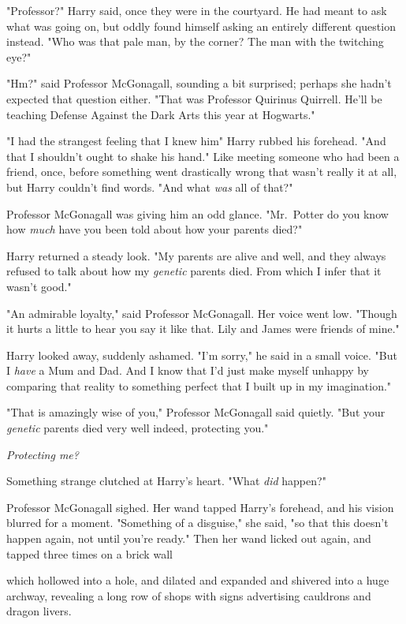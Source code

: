 "Professor?" Harry said, once they were in the courtyard. He had meant to ask
what was going on, but oddly found himself asking an entirely different
question instead. "Who was that pale man, by the corner? The man with the
twitching eye?"

"Hm?" said Professor McGonagall, sounding a bit surprised; perhaps she hadn't
expected that question either. "That was Professor Quirinus Quirrell. He'll be
teaching Defense Against the Dark Arts this year at Hogwarts."

"I had the strangest feeling that I knew him{\el}" Harry rubbed his
forehead. "And that I shouldn't ought to shake his hand." Like meeting someone
who had been a friend, once, before something went drastically wrong{\el}
that wasn't really it at all, but Harry couldn't find words. "And what
\emph{was{\el}} all of that?"

Professor McGonagall was giving him an odd glance. "Mr.~Potter{\el} do you
know{\el} how \emph{much} have you been told{\el} about how your parents
died?"

Harry returned a steady look. "My parents are alive and well, and they always
refused to talk about how my \emph{genetic} parents died. From which I infer
that it wasn't good."

"An admirable loyalty," said Professor McGonagall. Her voice went low. "Though
it hurts a little to hear you say it like that. Lily and James were friends of
mine."

Harry looked away, suddenly ashamed. "I'm sorry," he said in a small voice.
"But I \emph{have} a Mum and Dad. And I know that I'd just make myself unhappy
by comparing that reality to{\el} something perfect that I built up in my
imagination."

"That is amazingly wise of you," Professor McGonagall said quietly. "But your
\emph{genetic} parents died very well indeed, protecting you."

\emph{Protecting me?}

Something strange clutched at Harry's heart. "What{\el} \emph{did} happen?"

Professor McGonagall sighed. Her wand tapped Harry's forehead, and his vision
blurred for a moment. "Something of a disguise," she said, "so that this
doesn't happen again, not until you're ready." Then her wand licked out again,
and tapped three times on a brick wall{\el}

{\el}which hollowed into a hole, and dilated and expanded and shivered into
a huge archway, revealing a long row of shops with signs advertising cauldrons
and dragon livers.

